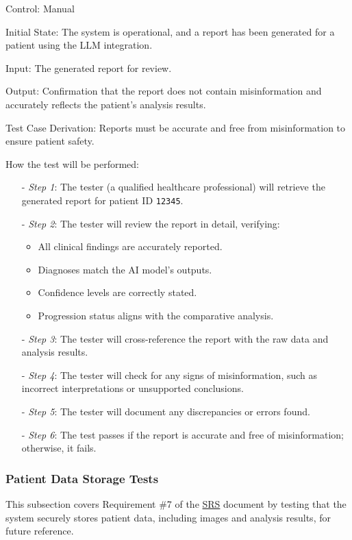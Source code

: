 \documentclass[12pt, titlepage]{article}
\begin{document}
\begin{enumerate}
  Control: Manual
  
  Initial State: The system is operational, and a report has been generated for a patient using the LLM integration.
  
  Input: The generated report for review.
  
  Output: Confirmation that the report does not contain misinformation and accurately reflects the patient's analysis results.
  
  Test Case Derivation: Reports must be accurate and free from misinformation to ensure patient safety.
  
  How the test will be performed:
  
  \begin{itemize}
  \item[-] \textit{Step 1}: The tester (a qualified healthcare professional) will retrieve the generated report for patient ID \texttt{12345}.
  \item[-] \textit{Step 2}: The tester will review the report in detail, verifying:
    \begin{itemize}
      \item All clinical findings are accurately reported.
      \item Diagnoses match the AI model's outputs.
      \item Confidence levels are correctly stated.
      \item Progression status aligns with the comparative analysis.
    \end{itemize}
  \item[-] \textit{Step 3}: The tester will cross-reference the report with the raw data and analysis results.
  \item[-] \textit{Step 4}: The tester will check for any signs of misinformation, such as incorrect interpretations or unsupported conclusions.
  \item[-] \textit{Step 5}: The tester will document any discrepancies or errors found.
  \item[-] \textit{Step 6}: The test passes if the report is accurate and free of misinformation; otherwise, it fails.
  \end{itemize}
\end{enumerate}

\subsubsection{Patient Data Storage Tests}

This subsection covers Requirement \#7 of the \href{https://github.com/RezaJodeiri/CXR-Capstone/blob/main/docs/SRS/SRS.pdf}{SRS} \citep{SRS}
document by testing that the system securely stores patient data, including images and analysis results, for future reference.
\end{document}
